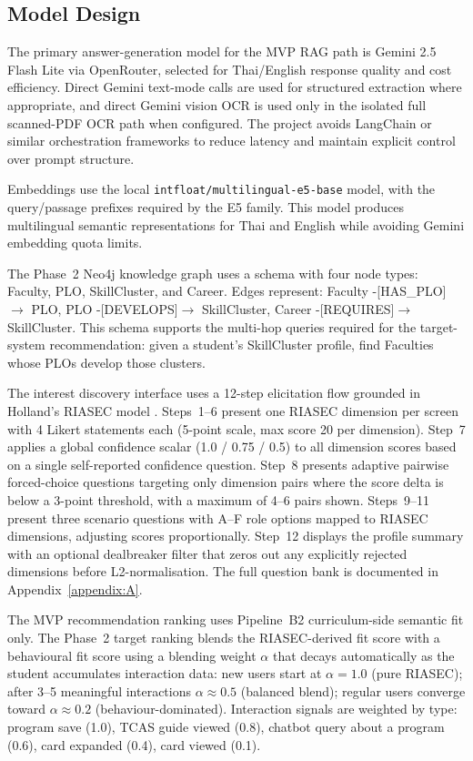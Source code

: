 \subsection{Model Design}
\label{subsection:model-design}

The primary answer-generation model for the MVP RAG path is Gemini 2.5 Flash Lite via OpenRouter, selected for Thai/English response quality and cost efficiency. Direct Gemini text-mode calls are used for structured extraction where appropriate, and direct Gemini vision OCR is used only in the isolated full scanned-PDF OCR path when configured. The project avoids LangChain or similar orchestration frameworks to reduce latency and maintain explicit control over prompt structure.

Embeddings use the local \texttt{intfloat/multilingual-e5-base} model, with the query/passage prefixes required by the E5 family. This model produces multilingual semantic representations for Thai and English while avoiding Gemini embedding quota limits.

The Phase~2 Neo4j knowledge graph uses a schema with four node types: Faculty, PLO, SkillCluster, and Career. Edges represent: Faculty -[HAS\_PLO]$\rightarrow$ PLO, PLO -[DEVELOPS]$\rightarrow$ SkillCluster, Career -[REQUIRES]$\rightarrow$ SkillCluster. This schema supports the multi-hop queries required for the target-system recommendation: given a student's SkillCluster profile, find Faculties whose PLOs develop those clusters.

The interest discovery interface uses a 12-step elicitation flow grounded in Holland's RIASEC model \cite{holland1997}. Steps~1--6 present one RIASEC dimension per screen with 4 Likert statements each (5-point scale, max score 20 per dimension). Step~7 applies a global confidence scalar (1.0 / 0.75 / 0.5) to all dimension scores based on a single self-reported confidence question. Step~8 presents adaptive pairwise forced-choice questions targeting only dimension pairs where the score delta is below a 3-point threshold, with a maximum of 4--6 pairs shown. Steps~9--11 present three scenario questions with A--F role options mapped to RIASEC dimensions, adjusting scores proportionally. Step~12 displays the profile summary with an optional dealbreaker filter that zeros out any explicitly rejected dimensions before L2-normalisation. The full question bank is documented in Appendix~\ref{appendix:A}.

The MVP recommendation ranking uses Pipeline~B2 curriculum-side semantic fit only. The Phase~2 target ranking blends the RIASEC-derived fit score with a behavioural fit score using a blending weight $\alpha$ that decays automatically as the student accumulates interaction data: new users start at $\alpha = 1.0$ (pure RIASEC); after 3--5 meaningful interactions $\alpha \approx 0.5$ (balanced blend); regular users converge toward $\alpha \approx 0.2$ (behaviour-dominated). Interaction signals are weighted by type: program save (1.0), TCAS guide viewed (0.8), chatbot query about a program (0.6), card expanded (0.4), card viewed (0.1).


